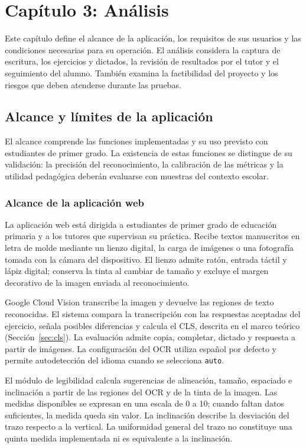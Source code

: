 \section{Capítulo 3: Análisis}

Este capítulo define el alcance de la aplicación, los requisitos de sus usuarios y las condiciones necesarias para su operación. El análisis considera la captura de escritura, los ejercicios y dictados, la revisión de resultados por el tutor y el seguimiento del alumno. También examina la factibilidad del proyecto y los riesgos que deben atenderse durante las pruebas.

\subsection{Alcance y límites de la aplicación}

El alcance comprende las funciones implementadas y su uso previsto con estudiantes de primer grado. La existencia de estas funciones se distingue de su validación: la precisión del reconocimiento, la calibración de las métricas y la utilidad pedagógica deberán evaluarse con muestras del contexto escolar.

\subsubsection{Alcance de la aplicación web}

La aplicación web está dirigida a estudiantes de primer grado de educación primaria y a los tutores que supervisan su práctica. Recibe textos manuscritos en letra de molde mediante un lienzo digital, la carga de imágenes o una fotografía tomada con la cámara del dispositivo. El lienzo admite ratón, entrada táctil y lápiz digital; conserva la tinta al cambiar de tamaño y excluye el margen decorativo de la imagen enviada al reconocimiento.

Google Cloud Vision transcribe la imagen y devuelve las regiones de texto reconocidas. El sistema compara la transcripción con las respuestas aceptadas del ejercicio, señala posibles diferencias y calcula el CLS, descrita en el marco teórico (Sección~\ref{sec:cls}). La evaluación admite copia, completar, dictado y respuesta a partir de imágenes. La configuración del OCR utiliza español por defecto y permite autodetección del idioma cuando se selecciona \texttt{auto}.

El módulo de legibilidad calcula sugerencias de alineación, tamaño, espaciado e inclinación a partir de las regiones del OCR y de la tinta de la imagen. Las medidas disponibles se expresan en una escala de 0 a 10; cuando faltan datos suficientes, la medida queda sin valor. La inclinación describe la desviación del trazo respecto a la vertical. La uniformidad general del trazo no constituye una quinta medida implementada ni es equivalente a la inclinación.

